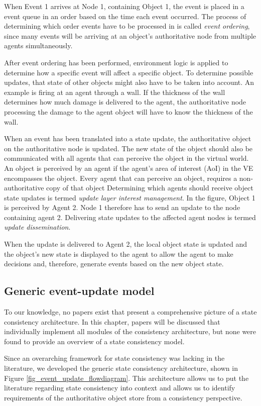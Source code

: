 When Event 1 arrives at Node 1, containing Object 1, the event is placed in a event queue in an order based on the time each event occurred. The process of determining which order events have to be processed in is called \emph{event ordering}, since many events will be arriving at an object's authoritative node from multiple agents simultaneously.

After event ordering has been performed, environment logic is applied to determine how a specific event will affect a specific object. To determine possible updates, that state of other objects might also have to be taken into account. An example is firing at an agent through a wall. If the thickness of the wall determines how much damage is delivered to the agent, the authoritative node processing the damage to the agent object will have to know the thickness of the wall.

When an event has been translated into a state update, the authoritative object on the authoritative node is updated. The new state of the object should also be communicated with all agents that can perceive the object in the virtual world. An object is perceived by an agent if the agent's area of interest (AoI)  in the VE encompasses the object. Every agent that can perceive an object, requires a non-authoritative copy of that object Determining which agents should receive object state updates is termed \emph{update layer interest management}. In the figure, Object 1 is perceived by Agent 2. Node 1 therefore has to send an update to the node containing agent 2. Delivering state updates to the affected agent nodes is termed \emph{update dissemination}.

When the update is delivered to Agent 2, the local object state is updated and the object's new state is displayed to the agent to allow the agent to make decisions and, therefore, generate events based on the new object state.

\subsection{Generic event-update model}
\label{generic_event_update_model}

To our knowledge, no papers exist that present a comprehensive picture of a state consistency architecture. In this chapter, papers will be discussed that individually implement all modules of the consistency architecture, but none were found to provide an overview of a state consistency model.

Since an overarching framework for state consistency was lacking in the literature, we developed the generic state consistency architecture, shown in Figure \ref{fig_event_update_flowdiagram}. This architecture allows us to put the literature regarding state consistency into context and allows us to identify requirements of the authoritative object store from a consistency perspective.

